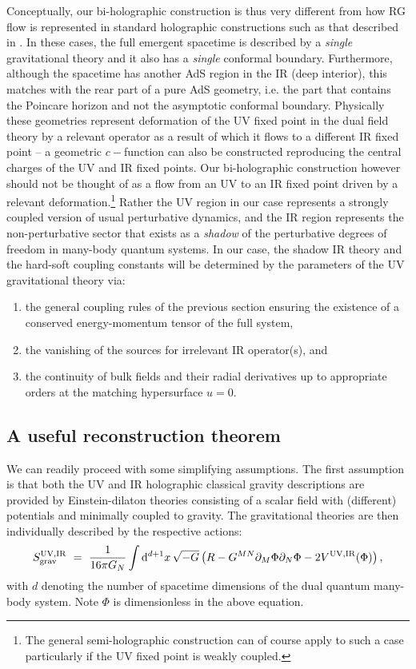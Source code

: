 \documentclass[prd,reprint,a4paper,showpacs,superscriptaddress,11pt,onecolumn,nofootinbib]{revtex4-1}
\renewcommand{\(}{\left(}
\renewcommand{\)}{\right)}
\newcommand{\6}{\partial}
\begin{document}
Conceptually, our bi-holographic construction is thus very different from how RG flow is represented in standard holographic constructions such as that described in \cite{Freedman:1999gp}. In these cases, the full emergent spacetime is described by a \textit{single} gravitational theory and it also has a \textit{single} conformal boundary. Furthermore, although the spacetime has another AdS region in the IR (deep interior), this matches with the rear part of a pure AdS geometry, i.e. the part that contains the Poincare horizon and not the asymptotic conformal boundary. Physically these geometries represent deformation of the UV fixed point in the dual field theory by a relevant operator as a result of which it flows to a different IR fixed point -- a geometric $c-$function can also be constructed \cite{Freedman:1999gp} reproducing the central charges of the UV and IR fixed points. Our bi-holographic construction however should not be thought of as a flow from an UV to an IR fixed point driven by a relevant deformation.\footnote{The general semi-holographic construction can of course apply to such a case particularly if the UV fixed point is weakly coupled.} Rather the UV region in our case represents a strongly coupled version of usual perturbative dynamics, and the IR region represents the non-perturbative sector that exists as a \textit{shadow} of the perturbative degrees of freedom in many-body quantum systems. In our case, the shadow IR theory and the hard-soft coupling constants will be determined by the parameters of the UV gravitational theory via:
\begin{enumerate}
\item the general coupling rules of the previous section ensuring the existence of a conserved energy-momentum tensor of the full system, 
\item the vanishing of the sources for irrelevant IR operator(s), and
\item the continuity of bulk fields and their radial derivatives up to appropriate orders at the matching hypersurface $u=0$.
\end{enumerate}



\subsection{A useful reconstruction theorem}\label{reconstruction}
We can readily proceed with some simplifying assumptions. The first assumption is that both the UV and IR holographic classical gravity descriptions are provided by Einstein-dilaton theories consisting of a scalar field with (different) potentials and minimally coupled to gravity. The gravitational theories are then individually described by the respective actions:
\begin{equation}\label{eqn:action}
S^{\rm UV, IR}_{\rm grav} ~ = ~ \dfrac{1}{16\pi G_N}\int {\rm d}^{d+1}x\,\sqrt{-G} \left(R - G^{MN} \partial_M\Phi \partial_N \Phi - 2 V^{\rm UV, IR}(\Phi) \right),
\end{equation}
with $d$ denoting the number of spacetime dimensions of the dual quantum many-body system. Note $\Phi$ is dimensionless in the above equation. 
\end{document}
